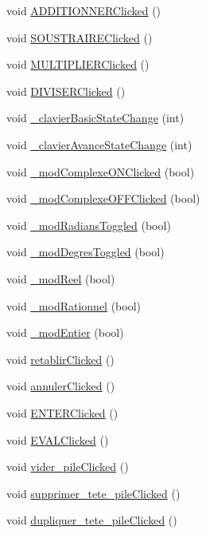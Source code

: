 \begin{DoxyCompactItemize}
\item 
void \hyperlink{class_main_window_a7babfc70d1010ea3e7efe67b788e0ec5}{\-A\-D\-D\-I\-T\-I\-O\-N\-N\-E\-R\-Clicked} ()
\item 
void \hyperlink{class_main_window_aef8aa8858f4a280f6da4ef6f6b4cf208}{\-S\-O\-U\-S\-T\-R\-A\-I\-R\-E\-Clicked} ()
\item 
void \hyperlink{class_main_window_a0fe4c051d0deac4c5eec64a6cd3d3682}{\-M\-U\-L\-T\-I\-P\-L\-I\-E\-R\-Clicked} ()
\item 
void \hyperlink{class_main_window_a785abff91c01b674c3b795dc289ae629}{\-D\-I\-V\-I\-S\-E\-R\-Clicked} ()
\item 
void \hyperlink{class_main_window_a0056914c89217bbef8879ccae4466e28}{\-\_\-clavier\-Basic\-State\-Change} (int)
\item 
void \hyperlink{class_main_window_a9200740951f715069c9f2bc7809f6e07}{\-\_\-clavier\-Avance\-State\-Change} (int)
\item 
void \hyperlink{class_main_window_a6febb02daee1abb1c9c0d0f9d190b25c}{\-\_\-mod\-Complexe\-O\-N\-Clicked} (bool)
\item 
void \hyperlink{class_main_window_a85b97292e1728650fc34d989170a0886}{\-\_\-mod\-Complexe\-O\-F\-F\-Clicked} (bool)
\item 
void \hyperlink{class_main_window_ae1cb8b4b1f79083accb25c66e6847abc}{\-\_\-mod\-Radians\-Toggled} (bool)
\item 
void \hyperlink{class_main_window_aa181a30bc86fd676299a828b6806fff7}{\-\_\-mod\-Degres\-Toggled} (bool)
\item 
void \hyperlink{class_main_window_a29e8205bc963cebba7a96f94f4d3c40f}{\-\_\-mod\-Reel} (bool)
\item 
void \hyperlink{class_main_window_af8e967129145a378e37fc2ff4eb1379c}{\-\_\-mod\-Rationnel} (bool)
\item 
void \hyperlink{class_main_window_a05cfdc8bf99fa145e67ce4d9eed03f20}{\-\_\-mod\-Entier} (bool)
\item 
void \hyperlink{class_main_window_abc93f16a699c5df5e5aedd67e1ad7e92}{retablir\-Clicked} ()
\item 
void \hyperlink{class_main_window_ad796f3d5c13e4ed2ea90e17aa0a3d7a8}{annuler\-Clicked} ()
\item 
void \hyperlink{class_main_window_a0ae0ae526c8fcc96c7f32fc3b3727224}{\-E\-N\-T\-E\-R\-Clicked} ()
\item 
void \hyperlink{class_main_window_a2472c42b862ef1dc38b75c4111a28590}{\-E\-V\-A\-L\-Clicked} ()
\item 
void \hyperlink{class_main_window_a164eb394f8581e1f80fba559bcc3d2e5}{vider\-\_\-pile\-Clicked} ()
\item 
void \hyperlink{class_main_window_a10bc645984994b33d7176946fc06eff2}{supprimer\-\_\-tete\-\_\-pile\-Clicked} ()
\item 
void \hyperlink{class_main_window_a4d771b6ac11d2280aa5e45e4d47a2011}{dupliquer\-\_\-tete\-\_\-pile\-Clicked} ()
\end{DoxyCompactItemize}
